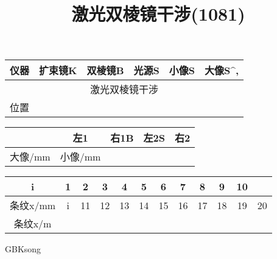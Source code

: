 \documentclass{article}
\title{激光双棱镜干涉(1081)}
\begin{document}
\begin{CJK}{GBK}{song}

\maketitle

\begin{tabular}{|c|c|c|c|c|c|}
\hline
仪器&扩束镜K&双棱镜B&光源S&小像S&大像S^,\\
\hline
\multicolumn{6}{|c|}{激光双棱镜干涉}\\
\hline
位置&
\hline
\end{tabular}

\begin{tabular}{|c|c|c|c|c|}
\hline
&左1&右1B&左2S&右2\\
\hline
大像/mm&
\hline
小像/mm&
\hline
\end{tabular}

\begin{tabular}{|c|c|c|c|c|c|c|c|c|c|c|}
\hline
i&1&2&3&4&5&6&7&8&9&10\\
\hline
条纹x/mm&
\hline
i&11&12&13&14&15&16&17&18&19&20\\
\hline
条纹x/m&
\hline
\end{tabular}

\end{CJK}{GBK}{song}
\end{document}
